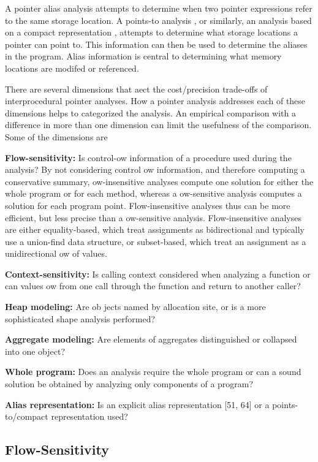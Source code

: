 A pointer alias analysis attempts to determine when two pointer expressions refer to the same storage location. A
points-to analysis , or similarly, an analysis based
on a compact representation , attempts to determine what storage locations a pointer can point to. This
information can then be used to determine the aliases in the program. Alias information is central to determining what
memory locations are modifed or referenced.

There are several dimensions that aect the cost/precision
trade-offs of interprocedural pointer analyses. How a pointer
analysis addresses each of these dimensions helps to categorized the analysis. An empirical comparison with a 
difference in more than one dimension can limit the usefulness of
the comparison. Some of the dimensions are

\textbf{ Flow-sensitivity:} Is control-ow information of a procedure used during the analysis? By not considering control
ow information, and therefore computing a conservative
summary, ow-insensitive analyses compute one solution for
either the whole program or for each method, whereas a ow-sensitive analysis computes a solution for each program point. 
Flow-insensitive analyses thus can be more efficient, but less precise than a ow-sensitive analysis. Flow-insensitive analyses
are either equality-based, which treat assignments as bidirectional and typically use a union-find data structure, 
or subset-based, which treat an assignment as
a unidirectional ow of values.

\textbf{ Context-sensitivity:} Is calling context considered when
analyzing a function or can values ow from one call through
the function and return to another caller?

\textbf{ Heap modeling:} Are ob jects named by allocation site,
or is a more sophisticated shape analysis performed?

\textbf{ Aggregate modeling:} Are elements of aggregates distinguished or collapsed into one object?

\textbf{ Whole program:} Does an analysis require the whole
program or can a sound solution be obtained by analyzing
only components of a program?

\textbf{ Alias representation:} Is an explicit alias representation [51, 64] or a points-to/compact representation used?


\subsection{Flow-Sensitivity}

